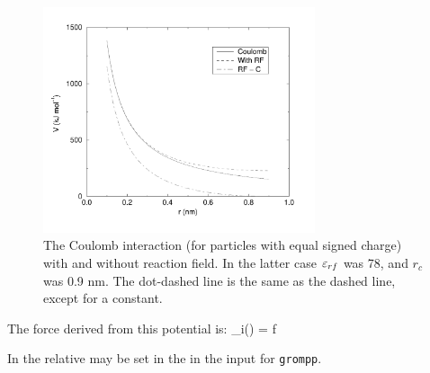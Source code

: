 \begin{figure}
\centerline{\includegraphics[width=8cm]{plots/vcrf}}
\caption[The Coulomb interaction with and without reaction field.]{The
Coulomb interaction (for particles with equal signed charge) with and
without reaction field. In the latter case $\varepsilon_{rf}$ was 78, and $r_c$
was 0.9 nm. The dot-dashed line is the same as the dashed line, except
for a constant.}
\label{fig:coul}
\end{figure}

The force derived from this potential is:
\beq
{}_i(\rvij) = f \rnorm
\eeq

In {\gromacs} the  relative  
\normindex{$\epsr$}
may be set in the in the input for {\tt grompp}. 

